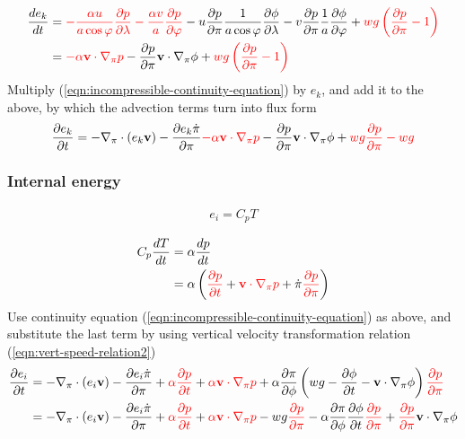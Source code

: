 \documentclass[12pt]{article}
\renewcommand{\d}[2]{\frac{d #1}{d #2}}
\newcommand{\dt}[1]{\d{#1}{t}}
\newcommand{\pd}[2]{\frac{\partial #1}{\partial #2}}
\newcommand{\pdt}[1]{\pd{#1}{t}}
\newcommand{\pdx}[2][1]{\frac{#1}{a \cos{\varphi}} \pd{#2}{\lambda}}
\newcommand{\pdy}[2][1]{\frac{#1}{a} \pd{#2}{\varphi}}
\newcommand{\pdz}[1]{\pd{#1}{\pi}}
\renewcommand{\vec}[1]{\mathbf{#1}}
\begin{document}
\begin{align*}
  \dt{e_k} & = {\color{red}- \pdx[\alpha u]{p} - \pdy[\alpha v]{p}} - u \pd{p}{\pi} \pdx{\phi} - v \pd{p}{\pi} \pdy{\phi} + {\color{red}w g \left( \pd{p}{\pi}- 1 \right)} \\
  & = {\color{red}- \alpha \vec{v} \cdot \nabla_\pi p} - \pd{p}{\pi} \vec{v} \cdot \nabla_\pi \phi + {\color{red}w g \left( \pd{p}{\pi} - 1 \right)}
\end{align*}
Multiply (\ref{eqn:incompressible-continuity-equation}) by $e_k$, and add it to the above, by which the advection terms turn into flux form
\begin{equation*}
  \pdt{e_k} = - \nabla_\pi \cdot \left(e_k \vec{v}\right) - \pdz{e_k \dot{\pi}} {\color{red}- \alpha \vec{v} \cdot \nabla_\pi p} - \pd{p}{\pi} \vec{v} \cdot \nabla_\pi \phi + {\color{red}w g \pd{p}{\pi} - w g}
\end{equation*}

\subsubsection{Internal energy}

\begin{align*}
  e_i = C_p T
\end{align*}

\begin{align*}
  C_p \dt{T} & = \alpha \dt{p} \\
  & = \alpha \left({\color{red}\pdt{p}} + {\color{red}\vec{v} \cdot \nabla_\pi p} + \dot{\pi} {\color{red}\pd{p}{\pi}} \right)
\end{align*}
Use continuity equation (\ref{eqn:incompressible-continuity-equation}) as above, and substitute the last term by using vertical velocity transformation relation (\ref{eqn:vert-speed-relation2})
\begin{align*}
  \pdt{e_i} & = - \nabla_\pi \cdot \left(e_i \vec{v}\right) - \pdz{e_i \dot{\pi}} + {\color{red}\alpha \pdt{p}} + {\color{red}\alpha \vec{v} \cdot \nabla_\pi p} + \alpha \pd{\pi}{\phi} \left(w g - \pdt{\phi} - \vec{v} \cdot \nabla_\pi \phi\right) {\color{red}\pd{p}{\pi}} \\
  & = - \nabla_\pi \cdot \left(e_i \vec{v}\right) - \pdz{e_i \dot{\pi}} + {\color{red}\alpha \pdt{p}} + {\color{red}\alpha \vec{v} \cdot \nabla_\pi p} - w g {\color{red}\pd{p}{\pi}} - \alpha \pd{\pi}{\phi} \pdt{\phi} {\color{red}\pd{p}{\pi}} + {\color{red}\pd{p}{\pi}} \vec{v} \cdot \nabla_\pi \phi
\end{align*}
\end{document}
